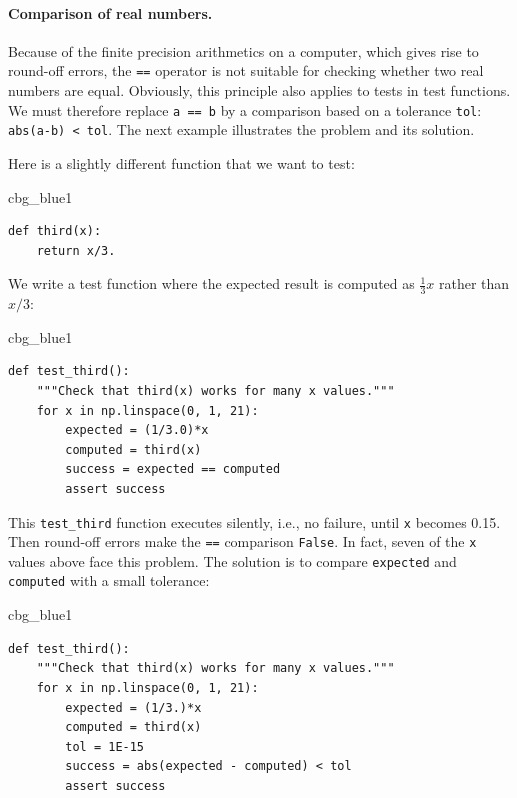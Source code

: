 \documentclass[%
oneside,                 %
final,                   %
10pt]{article}
\newenvironment{_cod_tight}[1]{
   \def\FrameCommand{\colorbox{#1}}
   \FrameRule0.6pt\MakeFramed {\FrameRestore}\vskip3mm}
   {\vskip0mm\endMakeFramed}
\newenvironment{cod}[1]{
\bgroup\rmfamily
\fboxsep=0mm\relax
\begin{_cod_tight}{#1}
\list{}{\parsep=-2mm\parskip=0mm\topsep=0pt\leftmargin=2mm
\rightmargin=2\leftmargin\leftmargin=4pt\relax}
\item\relax}
{\endlist\end{_cod_tight}\egroup}
\begin{document}
\paragraph{Comparison of real numbers.}
Because of the finite precision arithmetics on a computer, which gives
rise to round-off errors, the \texttt{==} operator is not suitable for
checking whether two real numbers are equal. Obviously, this principle
also applies to tests in test functions.
We must therefore replace \texttt{a == b} by a comparison
based on a tolerance \texttt{tol}: \texttt{abs(a-b) < tol}. The next example illustrates
the problem and its solution.

Here is a slightly different function that
we want to test:

\begin{cod}{cbg_blue1}\begin{Verbatim}[numbers=none,fontsize=\fontsize{9pt}{9pt},baselinestretch=0.95,xleftmargin=2mm]
def third(x):
    return x/3.
\end{Verbatim}
\end{cod}
\noindent
We write a test function where the expected result is computed as
$\frac{1}{3}x$ rather than $x/3$:

\begin{cod}{cbg_blue1}\begin{Verbatim}[numbers=none,fontsize=\fontsize{9pt}{9pt},baselinestretch=0.95,xleftmargin=2mm]
def test_third():
    """Check that third(x) works for many x values."""
    for x in np.linspace(0, 1, 21):
        expected = (1/3.0)*x
        computed = third(x)
        success = expected == computed
        assert success
\end{Verbatim}
\end{cod}
\noindent
This \Verb!test_third! function executes silently, i.e., no failure,
until \texttt{x} becomes 0.15. Then round-off errors make the \texttt{==} comparison
\texttt{False}. In fact, seven of the \texttt{x} values above face this problem.
The solution is to compare \texttt{expected} and \texttt{computed}
with a small tolerance:

\begin{cod}{cbg_blue1}\begin{Verbatim}[numbers=none,fontsize=\fontsize{9pt}{9pt},baselinestretch=0.95,xleftmargin=2mm]
def test_third():
    """Check that third(x) works for many x values."""
    for x in np.linspace(0, 1, 21):
        expected = (1/3.)*x
        computed = third(x)
        tol = 1E-15
        success = abs(expected - computed) < tol
        assert success
\end{Verbatim}
\end{cod}
\noindent
\end{document}
